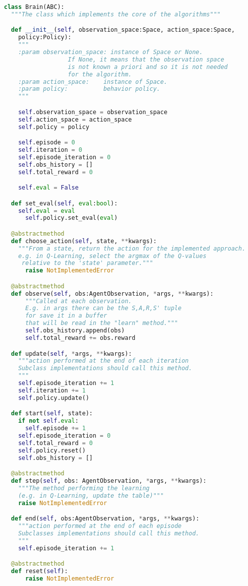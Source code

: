 \begin{lstlisting}[style=Python, language=Python, escapechar=£, label={code:brain}, caption={The \texttt{Brain} abstraction.}]
class Brain(ABC):
  """The class which implements the core of the algorithms"""

  def __init__(self, observation_space:Space, action_space:Space,
    policy:Policy):
    """
    :param observation_space: instance of Space or None.
                  If None, it means that the observation space
                  is not known a priori and so it is not needed
                  for the algorithm.
    :param action_space:    instance of Space.
    :param policy:          behavior policy.
    """

    self.observation_space = observation_space
    self.action_space = action_space
    self.policy = policy

    self.episode = 0
    self.iteration = 0
    self.episode_iteration = 0
    self.obs_history = []
    self.total_reward = 0

    self.eval = False

  def set_eval(self, eval:bool):
    self.eval = eval
      self.policy.set_eval(eval)

  @abstractmethod
  def choose_action(self, state, **kwargs):
    """From a state, return the action for the implemented approach.
    e.g. in Q-Learning, select the argmax of the Q-values
     relative to the 'state' parameter."""
      raise NotImplementedError

  @abstractmethod
  def observe(self, obs:AgentObservation, *args, **kwargs):
      """Called at each observation.
      E.g. in args there can be the S,A,R,S' tuple
      for save it in a buffer
      that will be read in the "learn" method."""
      self.obs_history.append(obs)
      self.total_reward += obs.reward

  def update(self, *args, **kwargs):
    """action performed at the end of each iteration
    Subclass implementations should call this method.
    """
    self.episode_iteration += 1
    self.iteration += 1
    self.policy.update()

  def start(self, state):
    if not self.eval:
      self.episode += 1
    self.episode_iteration = 0
    self.total_reward = 0
    self.policy.reset()
    self.obs_history = []

  @abstractmethod
  def step(self, obs: AgentObservation, *args, **kwargs):
    """The method performing the learning
    (e.g. in Q-Learning, update the table)"""
    raise NotImplementedError

  def end(self, obs:AgentObservation, *args, **kwargs):
    """action performed at the end of each episode
    Subclasses implementations should call this method.
    """
    self.episode_iteration += 1

  @abstractmethod
  def reset(self):
      raise NotImplementedError

\end{lstlisting}
